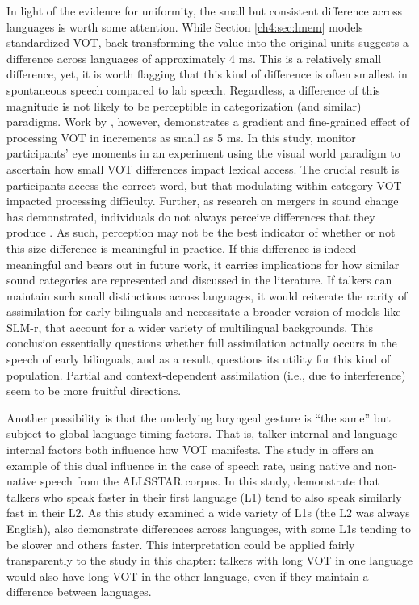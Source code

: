 In light of the evidence for uniformity, the small but consistent difference across languages is worth some attention. While Section \ref{ch4:sec:lmem} models standardized VOT, back-transforming the value into the original units suggests a difference across languages of approximately 4 ms. This is a relatively small difference, yet, it is worth flagging that this kind of difference is often smallest in spontaneous speech compared to lab speech. Regardless, a difference of this magnitude is not likely to be perceptible in categorization (and similar) paradigms. Work by \citet{mcmurray_2002_gradient}, however, demonstrates a gradient and fine-grained effect of processing VOT in increments as small as 5 ms. In this study, \citeauthor{mcmurray_2002_gradient} monitor participants' eye moments in an experiment using the visual world paradigm to ascertain how small VOT differences impact lexical access. The crucial result is participants access the correct word, but that modulating within-category VOT impacted processing difficulty. Further, as research on mergers in sound change has demonstrated, individuals do not always perceive differences that they produce \citep{yu_2019_individual, cheng_UR_production}. As such, perception may not be the best indicator of whether or not this size difference is meaningful in practice. If this difference is indeed meaningful and bears out in future work, it carries implications for how similar sound categories are represented and discussed in the literature. If talkers can maintain such small distinctions across languages, it would reiterate the rarity of assimilation for early bilinguals and necessitate a broader version of models like SLM-r, that account for a wider variety of multilingual backgrounds. This conclusion essentially questions whether full assimilation actually occurs in the speech of early bilinguals, and as a result, questions its utility for this kind of population. Partial and context-dependent assimilation (i.e., due to interference) seem to be more fruitful directions.

Another possibility is that the underlying laryngeal gesture is ``the same'' but subject to global language timing factors. That is, talker-internal and language-internal factors both influence how VOT manifests. The study in \citet{bradlow_2017_rate} offers an example of this dual influence in the case of speech rate, using native and non-native speech from the ALLSSTAR corpus. In this study, \citeauthor{bradlow_2017_rate} demonstrate that talkers who speak faster in their first language (L1) tend to also speak similarly fast in their L2. As this study examined a wide variety of L1s (the L2 was always English), \citeauthor{bradlow_2017_rate} also demonstrate differences across languages, with some L1s tending to be slower and others faster. This interpretation could be applied fairly transparently to the study in this chapter: talkers with long VOT in one language would also have long VOT in the other language, even if they maintain a difference between languages. 

